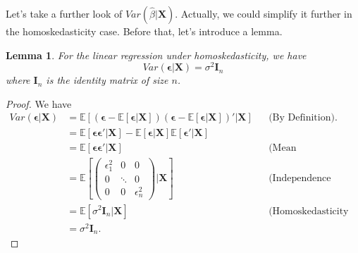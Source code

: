 \documentclass[11pt,a4paper]{amsart}
\theoremstyle{plain}
\newtheorem{lemma}{Lemma}
\theoremstyle{definition}
\begin{document}
	Let's take a further look of $Var(\hat{\beta} | \bm{X})$. Actually, we could simplify it further in the homoskedasticity case. Before that, let's introduce a lemma.
	\begin{lemma}\label{homo, cond. var. resid.}
		For the linear regression under homoskedasticity, we have 
		\[	Var( \bm{\epsilon}| \bm{X}) = \sigma^{2} \bm{I}_{n}	\]
		where $ \bm{I}_{n}$ is the identity matrix of size $n$. 
	\end{lemma}
	\begin{proof}
		We have 
		\[	\begin{aligned}
		Var( \bm{\epsilon}| \bm{X}) &= \mathbb{E}\left[(\bm{\epsilon} - \mathbb{E}[\bm{\epsilon}|\bm{X}]) (\bm{\epsilon} - \mathbb{E}[\bm{\epsilon}|\bm{X}]) '\Big| \bm{X}\right] &&\text{(By Definition).} \\
		&= \mathbb{E}\left[\bm{\epsilon}\bm{\epsilon}' \Big| \bm{X}\right] -  \mathbb{E}\left[\bm{\epsilon} \Big| \bm{X}\right]\mathbb{E}\left[\bm{\epsilon}' \Big| \bm{X}\right]\\
		&= \mathbb{E}\left[\bm{\epsilon}\bm{\epsilon}' \Big| \bm{X}\right] &&\text{(Mean Independence Assump.)} \\
		&= \mathbb{E}\left[\begin{pmatrix}
		\epsilon_{1}^{2} &0 & 0  \\
		0&\ddots&0 \\
		0 &0&	\epsilon_{n}^{2}
		\end{pmatrix}\Big| \bm{X}\right] &&\text{(Independence Assump.)} \\
		&= \mathbb{E}\left[ \sigma^{2} \bm{I}_{n} | \bm{X} \right] &&\text{(Homoskedasticity Assump.)} \\
		&= \sigma^{2} \bm{I}_{n}.
		\end{aligned}	\]
	\end{proof}
\end{document}
